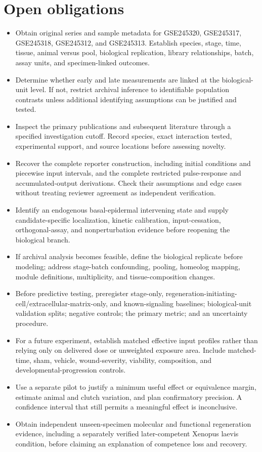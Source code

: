 \documentclass[11pt]{article}
\begin{document}
\section{Open obligations}
\begin{itemize}
\item Obtain original series and sample metadata for GSE245320, GSE245317, GSE245318, GSE245312, and GSE245313. Establish species, stage, time, tissue, animal versus pool, biological replication, library relationships, batch, assay units, and specimen-linked outcomes.
\item Determine whether early and late measurements are linked at the biological-unit level. If not, restrict archival inference to identifiable population contrasts unless additional identifying assumptions can be justified and tested.
\item Inspect the primary publications and subsequent literature through a specified investigation cutoff. Record species, exact interaction tested, experimental support, and source locations before assessing novelty.
\item Recover the complete reporter construction, including initial conditions and piecewise input intervals, and the complete restricted pulse-response and accumulated-output derivations. Check their assumptions and edge cases without treating reviewer agreement as independent verification.
\item Identify an endogenous basal-epidermal intervening state and supply candidate-specific localization, kinetic calibration, input-cessation, orthogonal-assay, and nonperturbation evidence before reopening the biological branch.
\item If archival analysis becomes feasible, define the biological replicate before modeling; address stage-batch confounding, pooling, homeolog mapping, module definitions, multiplicity, and tissue-composition changes.
\item Before predictive testing, preregister stage-only, regeneration-initiating-cell/extracellular-matrix-only, and known-signaling baselines; biological-unit validation splits; negative controls; the primary metric; and an uncertainty procedure.
\item For a future experiment, establish matched effective input profiles rather than relying only on delivered dose or unweighted exposure area. Include matched-time, sham, vehicle, wound-severity, viability, composition, and developmental-progression controls.
\item Use a separate pilot to justify a minimum useful effect or equivalence margin, estimate animal and clutch variation, and plan confirmatory precision. A confidence interval that still permits a meaningful effect is inconclusive.
\item Obtain independent unseen-specimen molecular and functional regeneration evidence, including a separately verified later-competent Xenopus laevis condition, before claiming an explanation of competence loss and recovery.
\end{itemize}
\end{document}
